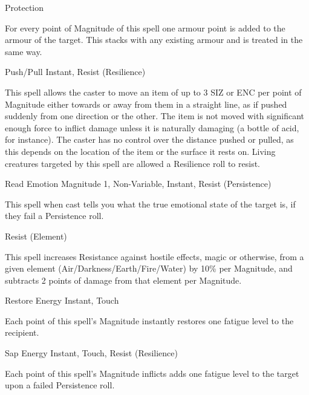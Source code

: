 \begin{rpg-spell}
{Protection}
{}

For every point of Magnitude of this spell one armour point is added to the armour of the target. This stacks with any existing armour and is treated in the same way. 
\end{rpg-spell}


\begin{rpg-spell}
{Push/Pull}
{Instant, Resist (Resilience)}

This spell allows the caster to move an item of up to 3 SIZ or ENC per point of Magnitude either towards or away from them in a straight line, as if pushed suddenly from one direction or the other. The item is not moved with significant enough force to inflict damage unless it is naturally damaging (a bottle of acid, for instance). The caster has no control over the distance pushed or pulled, as this depends on the location of the item or the surface it rests on. Living creatures targeted by this spell are allowed a Resilience roll to resist.
\end{rpg-spell}


\begin{rpg-spell}
{Read Emotion}
{Magnitude 1, Non-Variable, Instant, Resist (Persistence)}

This spell when cast tells you what the true emotional state of the target is, if they fail a Persistence roll.
\end{rpg-spell}


\begin{rpg-spell}
{Resist (Element)}
\nopagebreak
{}

This spell increases Resistance against hostile effects, magic or otherwise, from a given element (Air/Darkness/Earth/Fire/Water) by 10\% per Magnitude, and subtracts 2 points of damage from that element per Magnitude.
\end{rpg-spell}


\begin{rpg-spell}
{Restore Energy}
{Instant, Touch}

Each point of this spell’s Magnitude instantly restores one fatigue level to the recipient.
\end{rpg-spell}


\begin{rpg-spell}
{Sap Energy}
{Instant, Touch, Resist (Resilience)}

Each point of this spell’s Magnitude inflicts adds one fatigue level to the target upon a failed Persistence roll.
\end{rpg-spell}


